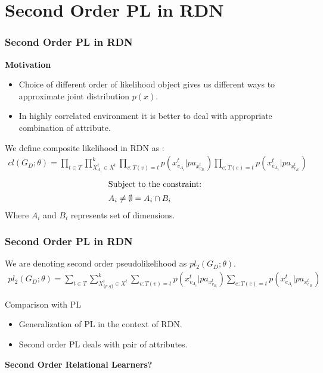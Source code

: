 \documentclass[10pt, blue,subsection=true, compress]{beamer}
\begin{document}
\section{Second Order PL in RDN}
\begin{frame}\frametitle{Second Order PL in RDN}
\begin{block}{\textbf{Motivation}}
\begin{itemize}
\item Choice of different order of likelihood object gives us different ways to approximate joint distribution $p(x)$.
\item In highly correlated environment it is better to deal with appropriate combination of attribute. 
\end{itemize}
\end{block}
We define composite likelihood in RDN as :
 \begin{align}
\label{eq:clgd}
 cl(G_D ; \theta)  =  \prod_{t  \in  T} \prod_{ X_{A_i}^t  \in X^t}^k \prod_{ v: T(v) = t } p ( x^t_{v_{A_i}} | pa_{ x^t_{v_{B_i}}}) 
 \prod_{ e :T(e) = t } p ( x^t_{e_{A_i}}  | pa_{ x^t_{e_{B_i}}}) 
\end{align}
\begin{align*}
 \intertext{Subject to the constraint:}
  \nonumber   A_i \neq \emptyset = A_i \cap B_i 
\end{align*}
Where $A_i$ and $B_i$ represents set of dimensions.
\end{frame}

\begin{frame}\frametitle{Second Order PL in RDN}
We are denoting second order pseudolikelihood as $pl_2(G_D ; \theta)$.
\begin{align} 
 pl_2(G_D ; \theta) = \sum_{t \in T} \sum_{X_{\{p,q\}}^t \in X^t}^k \sum_{v: T(v) = t} p (x^t_{v_{A_i}} | pa_{x^t_{v_{B_i}}}) 
\sum_{e :T(e) = t} p (x^t_{e_{A_i}} | pa_{x^t_{e_{B_i}}})
\end{align}
\begin{block}{Comparison with PL}
\begin{itemize}
\item Generalization of PL in the context of RDN.
\item Second order PL deals with pair of attributes.
\end{itemize}
\end{block}
\begin{block}{}
\begin{center}
\textbf{\color{red}
Second Order Relational Learners?}
\end{center}
\end{block}
\end{frame}
\end{document}
